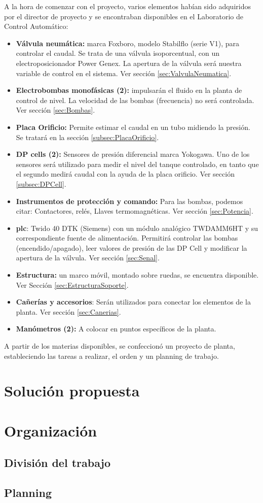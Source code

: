 A la hora de comenzar con el proyecto, varios elementos habían
sido adquiridos por el director de proyecto y se encontraban
disponibles en el Laboratorio de Control Automático:
\begin{itemize}
 \item \textbf{Válvula neumática:} marca Foxboro, modelo Stabilflo (serie V1), para controlar el 
 caudal. Se trata de una válvula isoporcentual, con un electroposicionador Power Genex.
 La apertura de la válvula será nuestra variable de control en el sistema. 
 Ver sección \ref{sec:ValvulaNeumatica}.
  \item \textbf{Electrobombas monofásicas (2):} impulsarán el fluido
  en la planta de control de nivel.
  La velocidad de las bombas (frecuencia) no será controlada.
  Ver sección \ref{sec:Bombas}.
  \item \textbf{Placa Orificio:} Permite estimar el 
  caudal en un tubo midiendo la presión.
  Se tratará en la sección \ref{subsec:PlacaOrificio}.
  \item \textbf{DP cells (2):} Sensores de presión 
  diferencial marca Yokogawa. 
  Uno de los sensores será utilizado para medir el nivel del tanque controlado,
  en tanto que el segundo medirá caudal con la ayuda de la placa orificio.
  Ver sección \ref{subsec:DPCell}.
  \item \textbf{Instrumentos de protección y comando:}
  Para las bombas, podemos citar: Contactores, relés, 
  Llaves termomagnéticas.
  Ver sección \ref{sec:Potencia}.
  \item{\textbf{\gls{plc}}}: Twido 40 DTK (Siemens) con un módulo
  analógico TWDAMM6HT y su correspondiente fuente de alimentación.
  Permitirá controlar las bombas (encendido/apagado), 
  leer valores de presión de las DP Cell y modificar la apertura de la 
  válvula. Ver sección \ref{sec:Senal}.
  \item \textbf{Estructura:} un marco móvil, montado sobre ruedas,
  se encuentra disponible. Ver Sección \ref{sec:EstructuraSoporte}.
  \item \textbf{Cañerías y accesorios}: Serán utilizados para 
  conectar los elementos de la planta. Ver sección \ref{sec:Canerias}.
  \item \textbf{Manómetros (2):} A colocar en 
  puntos específicos de la planta.
\end{itemize}

A partir de los materias disponibles, se confeccionó 
un proyecto de planta, estableciendo las tareas a realizar, el orden
y un planning de trabajo.

\section{Solución propuesta}
\label{sec:SolucionPropuesta}

\section{Organización}
\label{sec:Organizacion}
\subsection{División del trabajo}
\subsection{Planning}
